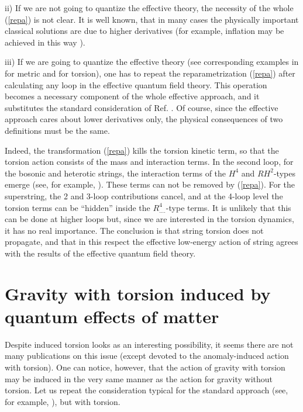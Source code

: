 ii) If we are not going to quantize the effective theory, the
necessity of the whole (\ref{repa}) is not clear. It is 
well known, that in many cases the physically important 
classical solutions are  due to higher derivatives 
(for example, inflation may be achieved in this way 
\cite{star,marot}).
\vskip 2mm

iii) If we are going to quantize the effective theory (see 
corresponding examples in \cite{don} for metric and 
\cite{betor,guhesh} for torsion), one has to repeat the 
reparametrization (\ref{repa}) after calculating any loop 
in the effective quantum field theory. This operation 
becomes a necessary component of the whole effective
approach, and it substitutes the standard consideration 
of Ref. \cite{effgrav,don}. Of course, since the 
effective approach cares about lower derivatives
only, the physical consequences of two definitions must
be the same.  
\vskip 2mm

Indeed, the transformation (\ref{repa}) kills the 
torsion kinetic term, so that the torsion action consists 
of the mass and interaction terms. 
In the second loop, for the bosonic and heterotic strings, 
the interaction terms of the $H^4$ and $RH^2$-types emerge
(see, for example, \cite{ketov}). These terms can 
not be removed by (\ref{repa}). For the superstring, the 
2 and 3-loop contributions cancel, and at the 4-loop 
level the torsion terms can be ``hidden'' inside the 
$R_{....}^4$-type terms. It is unlikely that this 
can be done at higher loops but, since we are interested 
in the torsion dynamics, it has no real importance. 
The conclusion is that string 
torsion does not propagate, and that in this respect 
the effective low-energy action of string agrees with
the results of the effective quantum field theory. 

\section{Gravity with torsion induced by quantum effects 
of matter}

Despite induced torsion looks as an interesting possibility, 
it seems there are not many publications on this issue (except
\cite{buodsh,anhesh} devoted to the anomaly-induced action
with torsion). One can notice, however, that
the action of gravity with torsion may be induced in the very same 
manner as the action for gravity without torsion. Let us repeat
the consideration typical for the standard approach (see, for 
example, \cite{adler}), but with torsion. 

